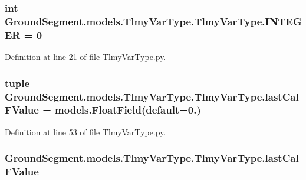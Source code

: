 \subsubsection[{I\+N\+T\+E\+G\+E\+R}]{\setlength{\rightskip}{0pt plus 5cm}int Ground\+Segment.\+models.\+Tlmy\+Var\+Type.\+Tlmy\+Var\+Type.\+I\+N\+T\+E\+G\+E\+R = 0\hspace{0.3cm}{\ttfamily [static]}}\label{class_ground_segment_1_1models_1_1_tlmy_var_type_1_1_tlmy_var_type_adc451c520401bd045ade72bc72a430af}


Definition at line 21 of file Tlmy\+Var\+Type.\+py.

\hypertarget{class_ground_segment_1_1models_1_1_tlmy_var_type_1_1_tlmy_var_type_aeec9d897714cc3dee96dbbc0559489f9}{}
\subsubsection[{last\+Cal\+F\+Value}]{\setlength{\rightskip}{0pt plus 5cm}tuple Ground\+Segment.\+models.\+Tlmy\+Var\+Type.\+Tlmy\+Var\+Type.\+last\+Cal\+F\+Value = models.\+Float\+Field(default=0.)\hspace{0.3cm}{\ttfamily [static]}}\label{class_ground_segment_1_1models_1_1_tlmy_var_type_1_1_tlmy_var_type_aeec9d897714cc3dee96dbbc0559489f9}


Definition at line 53 of file Tlmy\+Var\+Type.\+py.

\hypertarget{class_ground_segment_1_1models_1_1_tlmy_var_type_1_1_tlmy_var_type_addfc93bd7287219c19e1c68dcd72be80}{}
\subsubsection[{last\+Cal\+F\+Value}]{\setlength{\rightskip}{0pt plus 5cm}Ground\+Segment.\+models.\+Tlmy\+Var\+Type.\+Tlmy\+Var\+Type.\+last\+Cal\+F\+Value}\label{class_ground_segment_1_1models_1_1_tlmy_var_type_1_1_tlmy_var_type_addfc93bd7287219c19e1c68dcd72be80}


